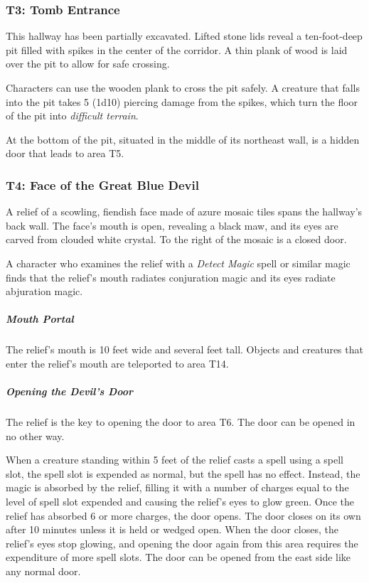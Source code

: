 \documentclass[10pt,a4paper,twoside,bg=print,twocolumn,openany,nodeprecatedcode]{dndbook}
\begin{document}
\subsubsection{T3: Tomb Entrance}
\begin{DndReadAloud}{}
This hallway has been partially excavated. Lifted stone lids reveal a ten-foot-deep pit filled with spikes in the center of the corridor. A thin plank of wood is laid over the pit to allow for safe crossing.

\end{DndReadAloud}

Characters can use the wooden plank to cross the pit safely. A creature that falls into the pit takes 5 (1d10) piercing damage from the spikes, which turn the floor of the pit into \textit{difficult terrain}.

At the bottom of the pit, situated in the middle of its northeast wall, is a hidden door that leads to area T5.

\subsubsection{T4: Face of the Great Blue Devil}
\begin{DndReadAloud}{}
A relief of a scowling, fiendish face made of azure mosaic tiles spans the hallway's back wall. The face's mouth is open, revealing a black maw, and its eyes are carved from clouded white crystal. To the right of the mosaic is a closed door.

\end{DndReadAloud}

A character who examines the relief with a \textit{Detect Magic} spell or similar magic finds that the relief's mouth radiates conjuration magic and its eyes radiate abjuration magic.

\subparagraph{Mouth Portal}
The relief's mouth is 10 feet wide and several feet tall. Objects and creatures that enter the relief's mouth are teleported to area T14.

\subparagraph{Opening the Devil's Door}
The relief is the key to opening the door to area T6. The door can be opened in no other way.

When a creature standing within 5 feet of the relief casts a spell using a spell slot, the spell slot is expended as normal, but the spell has no effect. Instead, the magic is absorbed by the relief, filling it with a number of charges equal to the level of spell slot expended and causing the relief's eyes to glow green. Once the relief has absorbed 6 or more charges, the door opens. The door closes on its own after 10 minutes unless it is held or wedged open. When the door closes, the relief's eyes stop glowing, and opening the door again from this area requires the expenditure of more spell slots. The door can be opened from the east side like any normal door.
\end{document}
